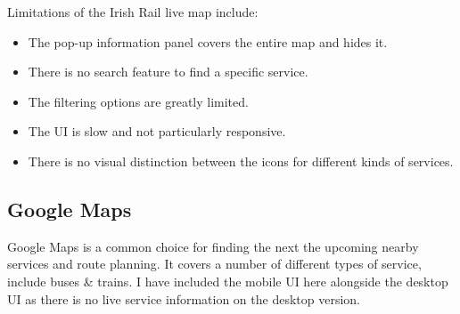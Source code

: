 \documentclass[a4paper,11pt]{article}
\begin{document}
Limitations of the Irish Rail live map include:
\begin{itemize}
    \item   The pop-up information panel covers the entire map and hides it.
    \item   There is no search feature to find a specific service.
    \item   The filtering options are greatly limited.
    \item   The UI is slow and not particularly responsive.
    \item   There is no visual distinction between the icons for different kinds of services.
\end{itemize}

\subsection{Google Maps}
Google Maps\supercite{gmaps} is a common choice for finding the next the upcoming nearby services and route planning.
It covers a number of different types of service, include buses \& trains.
I have included the mobile UI here alongside the desktop UI as there is no live service information on the desktop version.
\end{document}
